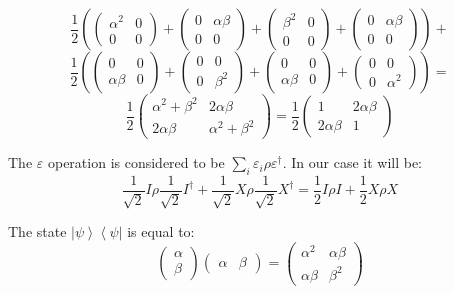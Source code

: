 \documentclass[a4paper,10pt]{article}
\newcommand{\bra}[1]{\ensuremath{\left\langle#1\right|}} %
\newcommand{\ket}[1]{\ensuremath{\left|#1\right\rangle}} %
\newcommand{\asp}{\ensuremath{\frac{1}{\sqrt{2}}}}
\newcommand{\ap}{\ensuremath{\frac{1}{2}}}
\begin{document}
\begin{enumerate}[1.]
$$
\ap \left(
\left(\begin{array}{cc}\alpha^2&0\\0&0\end{array}\right) + 
\left(\begin{array}{cc}0&\alpha\beta\\0&0\end{array}\right) +
\left(\begin{array}{cc}\beta^2&0\\0&0\end{array}\right) + 
\left(\begin{array}{cc}0&\alpha\beta\\0&0\end{array}\right)\right) + 
$$
$$
\ap \left(
\left(\begin{array}{cc}0&0\\\alpha\beta&0\end{array}\right) +
\left(\begin{array}{cc}0&0\\0&\beta^2\end{array}\right) +
\left(\begin{array}{cc}0&0\\\alpha\beta&0\end{array}\right)+
\left(\begin{array}{cc}0&0\\0&\alpha^2\end{array}\right)
\right)=
$$
$$
\ap
\left(\begin{array}{cc}\alpha^2+\beta^2&2\alpha\beta\\2\alpha\beta&\alpha^2+\beta^2\end{array}\right)=\ap\left(\begin{array}{cc}1&2\alpha\beta\\2\alpha\beta&1\end{array}\right)
$$

The $\varepsilon$ operation is considered to be $\sum_i \varepsilon_i \rho \varepsilon^\dagger$. In our case it will be:
$$
\asp I \rho  \asp I^\dagger + \asp X \rho \asp X^\dagger = \ap I \rho  I + \ap X \rho X
$$

The state \ket{\psi}\bra{\psi} is equal to:
$$
\left(
\begin{array}{c}
\alpha\\
\beta
\end{array}
\right)
\left(
\begin{array}{cc}
\alpha & \beta
\end{array}
\right)
=
\left(
\begin{array}{cc}
\alpha^2 & \alpha\beta \\
\alpha\beta & \beta^2
\end{array}
\right)
$$


\end{enumerate}
\end{document}
